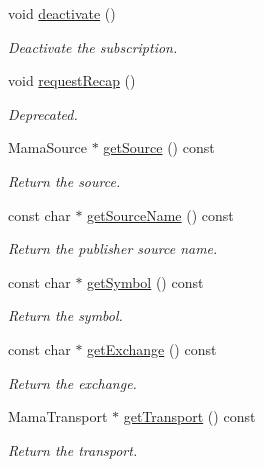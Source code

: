 \begin{CompactItemize}
void \hyperlink{classWombat_1_1MamdaSubscription_c4466ddd103f5ba5b0bf3d6f13a327c3}{deactivate} ()
\begin{CompactList}\small\item\em Deactivate the subscription. \item\end{CompactList}\item 
void \hyperlink{classWombat_1_1MamdaSubscription_454ece35b510c1ccd4b955d99c1d97df}{request\-Recap} ()
\begin{CompactList}\small\item\em Deprecated. \item\end{CompactList}\item 
Mama\-Source $\ast$ \hyperlink{classWombat_1_1MamdaSubscription_37067ac081e5a1dba009de761dc62f1a}{get\-Source} () const 
\begin{CompactList}\small\item\em Return the source. \item\end{CompactList}\item 
const char $\ast$ \hyperlink{classWombat_1_1MamdaSubscription_37cfea863393d4f059c4b8c0dda71bfb}{get\-Source\-Name} () const 
\begin{CompactList}\small\item\em Return the publisher source name. \item\end{CompactList}\item 
const char $\ast$ \hyperlink{classWombat_1_1MamdaSubscription_e18c4e39125211c3a77acd421570177b}{get\-Symbol} () const 
\begin{CompactList}\small\item\em Return the symbol. \item\end{CompactList}\item 
const char $\ast$ \hyperlink{classWombat_1_1MamdaSubscription_41f68917cc5dca283dc667fdc2db11e6}{get\-Exchange} () const 
\begin{CompactList}\small\item\em Return the exchange. \item\end{CompactList}\item 
Mama\-Transport $\ast$ \hyperlink{classWombat_1_1MamdaSubscription_90ee867ad6306beb8327121db2379988}{get\-Transport} () const 
\begin{CompactList}\small\item\em Return the transport. \item\end{CompactList}\item 

\end{CompactItemize}
